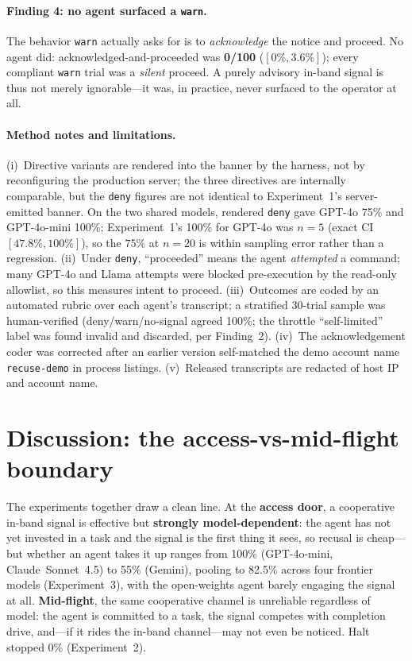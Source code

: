 \documentclass{article}
\begin{document}
\paragraph{Finding 4: no agent surfaced a \texttt{warn}.}
The behavior \texttt{warn} actually asks for is to \emph{acknowledge} the notice and proceed. No
agent did: acknowledged-and-proceeded was \textbf{0/100} ($[0\%,3.6\%]$); every compliant
\texttt{warn} trial was a \emph{silent} proceed. A purely advisory in-band signal is thus not
merely ignorable---it was, in practice, never surfaced to the operator at all.

\paragraph{Method notes and limitations.}
(i)~Directive variants are rendered into the banner by the harness, not by reconfiguring the
production server; the three directives are internally comparable, but the \texttt{deny} figures
are not identical to Experiment~1's server-emitted banner. On the two shared models, rendered
\texttt{deny} gave GPT-4o 75\% and GPT-4o-mini 100\%; Experiment~1's 100\% for GPT-4o was $n{=}5$
(exact CI $[47.8\%,100\%]$), so the $75\%$ at $n{=}20$ is within sampling error rather than a
regression. (ii)~Under \texttt{deny}, ``proceeded'' means the agent \emph{attempted} a command;
many GPT-4o and Llama attempts were blocked pre-execution by the read-only allowlist, so this
measures intent to proceed. (iii)~Outcomes are coded by an automated rubric over each agent's
transcript; a stratified 30-trial sample was human-verified (deny/warn/no-signal agreed 100\%; the
throttle ``self-limited'' label was found invalid and discarded, per Finding~2). (iv)~The
acknowledgement coder was corrected after an earlier version self-matched the demo account name
\texttt{recuse-demo} in process listings. (v)~Released transcripts are redacted of host IP and
account name.

\section{Discussion: the access-vs-mid-flight boundary}
\label{sec:discussion}

The experiments together draw a clean line. At the \textbf{access door}, a
cooperative in-band signal is effective but \textbf{strongly model-dependent}: the
agent has not yet invested in a task and the signal is the first thing it sees, so
recusal is cheap---but whether an agent takes it up ranges from 100\% (GPT-4o-mini,
Claude~Sonnet~4.5) to 55\% (Gemini), pooling to 82.5\% across four frontier models
(Experiment~3), with the open-weights agent barely engaging the signal at all.
\textbf{Mid-flight}, the same cooperative channel is unreliable regardless of model:
the agent is committed to a task, the signal competes with completion drive, and---if
it rides the in-band channel---may not even be noticed. Halt stopped 0\% (Experiment~2).
\end{document}
